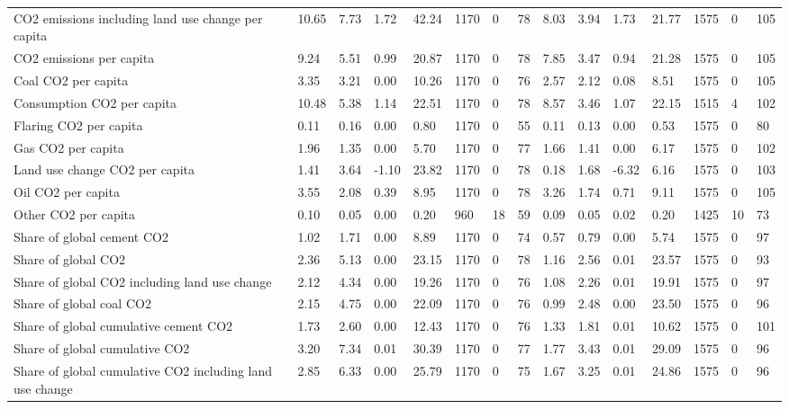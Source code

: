 \begin{longtable}{lllllllllllllll}
CO2 emissions including land use change per capita & 10.65 & 7.73 & 1.72 & 42.24 & 1170 & 0 & 78 & 8.03 & 3.94 & 1.73 & 21.77 & 1575 & 0 & 105\\
CO2 emissions per capita & 9.24 & 5.51 & 0.99 & 20.87 & 1170 & 0 & 78 & 7.85 & 3.47 & 0.94 & 21.28 & 1575 & 0 & 105\\
Coal CO2 per capita & 3.35 & 3.21 & 0.00 & 10.26 & 1170 & 0 & 76 & 2.57 & 2.12 & 0.08 & 8.51 & 1575 & 0 & 105\\
Consumption CO2 per capita & 10.48 & 5.38 & 1.14 & 22.51 & 1170 & 0 & 78 & 8.57 & 3.46 & 1.07 & 22.15 & 1515 & 4 & 102\\
\addlinespace
Flaring CO2 per capita & 0.11 & 0.16 & 0.00 & 0.80 & 1170 & 0 & 55 & 0.11 & 0.13 & 0.00 & 0.53 & 1575 & 0 & 80\\
Gas CO2 per capita & 1.96 & 1.35 & 0.00 & 5.70 & 1170 & 0 & 77 & 1.66 & 1.41 & 0.00 & 6.17 & 1575 & 0 & 102\\
Land use change CO2 per capita & 1.41 & 3.64 & -1.10 & 23.82 & 1170 & 0 & 78 & 0.18 & 1.68 & -6.32 & 6.16 & 1575 & 0 & 103\\
Oil CO2 per capita & 3.55 & 2.08 & 0.39 & 8.95 & 1170 & 0 & 78 & 3.26 & 1.74 & 0.71 & 9.11 & 1575 & 0 & 105\\
Other CO2 per capita & 0.10 & 0.05 & 0.00 & 0.20 & 960 & 18 & 59 & 0.09 & 0.05 & 0.02 & 0.20 & 1425 & 10 & 73\\
\addlinespace
Share of global cement CO2 & 1.02 & 1.71 & 0.00 & 8.89 & 1170 & 0 & 74 & 0.57 & 0.79 & 0.00 & 5.74 & 1575 & 0 & 97\\
Share of global CO2 & 2.36 & 5.13 & 0.00 & 23.15 & 1170 & 0 & 78 & 1.16 & 2.56 & 0.01 & 23.57 & 1575 & 0 & 93\\
Share of global CO2 including land use change & 2.12 & 4.34 & 0.00 & 19.26 & 1170 & 0 & 76 & 1.08 & 2.26 & 0.01 & 19.91 & 1575 & 0 & 97\\
Share of global coal CO2 & 2.15 & 4.75 & 0.00 & 22.09 & 1170 & 0 & 76 & 0.99 & 2.48 & 0.00 & 23.50 & 1575 & 0 & 96\\
Share of global cumulative cement CO2 & 1.73 & 2.60 & 0.00 & 12.43 & 1170 & 0 & 76 & 1.33 & 1.81 & 0.01 & 10.62 & 1575 & 0 & 101\\
\addlinespace
Share of global cumulative CO2 & 3.20 & 7.34 & 0.01 & 30.39 & 1170 & 0 & 77 & 1.77 & 3.43 & 0.01 & 29.09 & 1575 & 0 & 96\\
Share of global cumulative CO2 including land use change & 2.85 & 6.33 & 0.00 & 25.79 & 1170 & 0 & 75 & 1.67 & 3.25 & 0.01 & 24.86 & 1575 & 0 & 96\\

\end{longtable}
